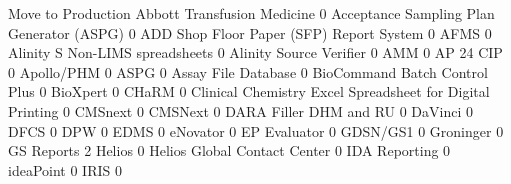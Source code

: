 \documentclass{article}
\begin{document}
\begin{Schunk}
\begin{Soutput}
                                                            Move to Production
  Abbott Transfusion Medicine                                                0
  Acceptance Sampling Plan Generator (ASPG)                                  0
  ADD Shop Floor Paper (SFP) Report System                                   0
  AFMS                                                                       0
  Alinity S Non-LIMS spreadsheets                                            0
  Alinity Source Verifier                                                    0
  AMM                                                                        0
  AP 24 CIP                                                                  0
  Apollo/PHM                                                                 0
  ASPG                                                                       0
  Assay File Database                                                        0
  BioCommand Batch Control Plus                                              0
  BioXpert                                                                   0
  CHaRM                                                                      0
  Clinical Chemistry Excel Spreadsheet for Digital Printing                  0
  CMSnext                                                                    0
  CMSNext                                                                    0
  DARA Filler DHM and RU                                                     0
  DaVinci                                                                    0
  DFCS                                                                       0
  DPW                                                                        0
  EDMS                                                                       0
  eNovator                                                                   0
  EP Evaluator                                                               0
  GDSN/GS1                                                                   0
  Groninger                                                                  0
  GS Reports                                                                 2
  Helios                                                                     0
  Helios Global Contact Center                                               0
  IDA Reporting                                                              0
  ideaPoint                                                                  0
  IRIS                                                                       0

\end{Soutput}
\end{Schunk}
\end{document}
